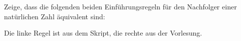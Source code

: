 \documentclass{uebung}
\begin{document}
\begin{exercise}
  Zeige, dass die folgenden beiden Einführungsregeln für den Nachfolger einer natürlichen Zahl äquivalent sind:
  {\tiny Die linke Regel ist aus dem Skript, die rechte aus der Vorlesung.}
\end{exercise}
\end{document}

